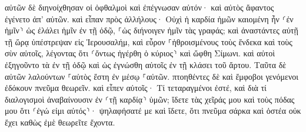 \documentclass{openreader}
\begin{document}
αὐτῶν δὲ διηνοίχθησαν οἱ ὀφθαλμοὶ καὶ ἐπέγνωσαν αὐτόν· καὶ αὐτὸς ἄφαντος ἐγένετο ἀπ’ αὐτῶν. 
καὶ εἶπαν πρὸς ἀλλήλους· Οὐχὶ ἡ καρδία ἡμῶν καιομένη ἦν ⸂ἐν ἡμῖν⸃ ὡς ἐλάλει ἡμῖν ἐν τῇ ὁδῷ, ⸀ὡς διήνοιγεν ἡμῖν τὰς γραφάς; 
καὶ ἀναστάντες αὐτῇ τῇ ὥρᾳ ὑπέστρεψαν εἰς Ἰερουσαλήμ, καὶ εὗρον ⸀ἠθροισμένους τοὺς ἕνδεκα καὶ τοὺς σὺν αὐτοῖς, 
λέγοντας ὅτι ⸂ὄντως ἠγέρθη ὁ κύριος⸃ καὶ ὤφθη Σίμωνι. 
καὶ αὐτοὶ ἐξηγοῦντο τὰ ἐν τῇ ὁδῷ καὶ ὡς ἐγνώσθη αὐτοῖς ἐν τῇ κλάσει τοῦ ἄρτου. 
Ταῦτα δὲ αὐτῶν λαλούντων ⸀αὐτὸς ἔστη ἐν μέσῳ ⸀αὐτῶν. 
πτοηθέντες δὲ καὶ ἔμφοβοι γενόμενοι ἐδόκουν πνεῦμα θεωρεῖν. 
καὶ εἶπεν αὐτοῖς· Τί τεταραγμένοι ἐστέ, καὶ διὰ τί διαλογισμοὶ ἀναβαίνουσιν ἐν ⸂τῇ καρδίᾳ⸃ ὑμῶν; 
ἴδετε τὰς χεῖράς μου καὶ τοὺς πόδας μου ὅτι ⸂ἐγώ εἰμι αὐτός⸃· ψηλαφήσατέ με καὶ ἴδετε, ὅτι πνεῦμα σάρκα καὶ ὀστέα οὐκ ἔχει καθὼς ἐμὲ θεωρεῖτε ἔχοντα. 
\end{document}
